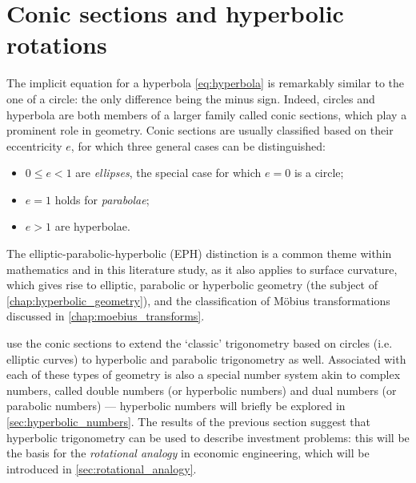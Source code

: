 \section{Conic sections and hyperbolic rotations}
The implicit equation for a hyperbola \cref{eq:hyperbola} is remarkably similar to the one of a circle: the only difference being the minus sign. Indeed, circles and hyperbola are both members of a larger family called conic sections, which play a prominent role in geometry. Conic sections are usually classified based on their eccentricity $e$, for which three general cases can be distinguished:
\begin{itemize}
    \item $0 \leq e < 1$ are \emph{ellipses}, the special case for which $e = 0$ is a circle;
    \item $e = 1$ holds for \emph{parabolae};
    \item $e > 1$ are hyperbolae.
\end{itemize}
The elliptic-parabolic-hyperbolic (EPH) distinction is a common theme within mathematics and in this literature study, as it also applies to surface curvature, which gives rise to elliptic, parabolic or hyperbolic geometry (the subject of \cref{chap:hyperbolic_geometry}), and the classification of Möbius transformations discussed in \cref{chap:moebius_transforms}.

\citet{Harkin2004} use the conic sections to extend the `classic' trigonometry based on circles (i.e. elliptic curves) to hyperbolic and parabolic trigonometry as well. Associated with each of these types of geometry is also a special number system akin to complex numbers, called double numbers (or hyperbolic numbers) and dual numbers (or parabolic numbers) --- hyperbolic numbers will briefly be explored in \cref{sec:hyperbolic_numbers}. The results of the previous section suggest that hyperbolic trigonometry can be used to describe investment problems: this will be the basis for the \emph{rotational analogy} in economic engineering, which will be introduced in \cref{sec:rotational_analogy}.

